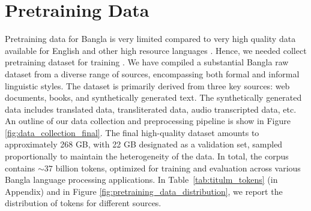 \section{Pretraining Data}
\label{sec:datasets}
Pretraining data for Bangla is very limited compared to very high quality data available for English and other high resource languages \cite{penedo2023refinedweb,soldaini2024dolma}. Hence, we needed collect pretraining dataset for training \titu{}. We have compiled a substantial Bangla raw dataset from a diverse range of sources, encompassing both formal and informal linguistic styles. The dataset is primarily derived from three key sources: web documents, books, and synthetically generated text. The synthetically generated data includes translated data, transliterated data, audio transcripted data, etc. An outline of our data collection and preprocessing pipeline is show in Figure  \ref{fig:data_collection_final}. The final high-quality dataset amounts to approximately 268 GB, with 22 GB designated as a validation set, sampled proportionally to maintain the heterogeneity of the data. In total, the corpus contains $\sim37$ billion tokens, optimized for training and evaluation across various Bangla language processing applications. In Table~\ref{tab:titulm_tokens} (in Appendix) and in Figure \ref{fig:pretraining_data_distribution}, we report the distribution of tokens for different sources.





